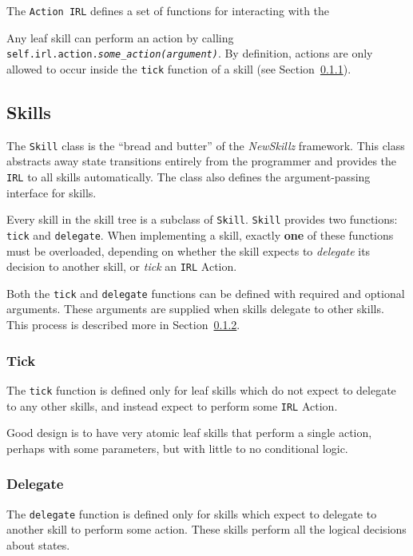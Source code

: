 The \texttt{Action IRL} defines a set of functions for interacting with the 

Any leaf skill can perform an action by calling \texttt{self.irl.action.\textit{some\_action(argument)}}. By definition, actions are only allowed to occur inside the \texttt{tick} function of a skill (see Section~\ref{sec:tick}).

\subsection{Skills}

The \texttt{Skill} class is the ``bread and butter'' of the \textit{NewSkillz} framework. This class abstracts away state transitions entirely from the programmer and provides the \texttt{IRL} to all skills automatically. The class also defines the argument-passing interface for skills.

Every skill in the skill tree is a subclass of \texttt{Skill}. \texttt{Skill} provides two functions: \texttt{tick} and \texttt{delegate}. When implementing a skill, exactly \textbf{one} of these functions must be overloaded, depending on whether the skill expects to \textit{delegate} its decision to another skill, or \textit{tick} an \texttt{IRL} Action.

Both the \texttt{tick} and \texttt{delegate} functions can be defined with required and optional arguments. These arguments are supplied when skills delegate to other skills. This process is described more in Section~\ref{sec:delegate}.

\subsubsection{Tick}
\label{sec:tick}

The \texttt{tick} function is defined only for leaf skills which do not expect to delegate to any other skills, and instead expect to perform some \texttt{IRL} Action.

Good design is to have very atomic leaf skills that perform a single action, perhaps with some parameters, but with little to no conditional logic.

\subsubsection{Delegate}
\label{sec:delegate}

The \texttt{delegate} function is defined only for skills which expect to delegate to another skill to perform some action. These skills perform all the logical decisions about states.

